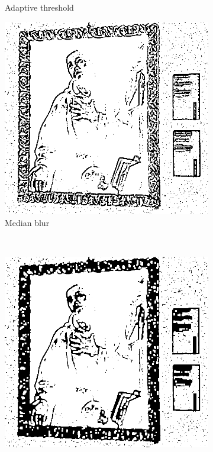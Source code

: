 \begin{figure}[ht!]
\begin{subfigure}[t]{0.3\textwidth}
        \caption*{Adaptive threshold}\label{fig:adaptive_threshold}
      \end{subfigure}\hfill
      \begin{subfigure}[t]{0.3\textwidth}%
        \includegraphics[width=\linewidth]{pictures/painting_detection/3-median_blur.PNG}
        \caption*{Median blur}\label{fig:median_blur}
      \end{subfigure}
      \\
      \begin{subfigure}[b]{0.3\textwidth}
        \includegraphics[width=\linewidth]{pictures/painting_detection/4-opening.PNG}

\end{subfigure}
\end{figure}
